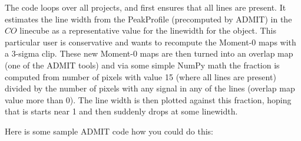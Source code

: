 \documentclass[preprint]{aastex} %
\begin{document}
The code loops over all projects, and first ensures that all lines are
present. It estimates the line width from the PeakProfile (precomputed
by ADMIT) in the $CO$ linecube as a representative value for the
linewidth for the object.  This particular user is conservative and
wants to recompute the Moment-0 maps with a 3-sigma clip. These new
Moment-0 maps are then turned into an overlap map (one of the ADMIT
tools) and via some simple NumPy math the fraction is computed from
number of pixels with value 15 (where all lines are present) divided
by the number of pixels with any signal in any of the lines (overlap
map value more than 0).  The line width is then plotted against this
fraction, hoping that is starts near 1 and then suddenly drops at some
linewidth.

Here is some sample ADMIT code how you could do this:

\newpage
\end{document}
